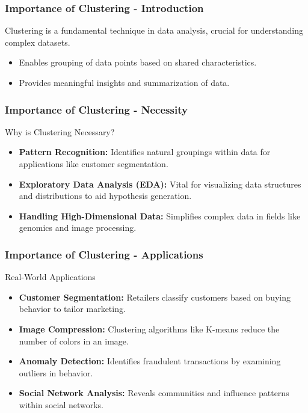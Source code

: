 \documentclass[aspectratio=169]{beamer}
\begin{document}
\begin{frame}[fragile]
    \frametitle{Importance of Clustering - Introduction}
    Clustering is a fundamental technique in data analysis, crucial for understanding complex datasets. 
    \begin{itemize}
        \item Enables grouping of data points based on shared characteristics.
        \item Provides meaningful insights and summarization of data.
    \end{itemize}
\end{frame}

\begin{frame}[fragile]
    \frametitle{Importance of Clustering - Necessity}
    \begin{block}{Why is Clustering Necessary?}
        \begin{itemize}
            \item \textbf{Pattern Recognition:} Identifies natural groupings within data for applications like customer segmentation.
            \item \textbf{Exploratory Data Analysis (EDA):} Vital for visualizing data structures and distributions to aid hypothesis generation.
            \item \textbf{Handling High-Dimensional Data:} Simplifies complex data in fields like genomics and image processing.
        \end{itemize}
    \end{block}
\end{frame}

\begin{frame}[fragile]
    \frametitle{Importance of Clustering - Applications}
    \begin{block}{Real-World Applications}
        \begin{itemize}
            \item \textbf{Customer Segmentation:} Retailers classify customers based on buying behavior to tailor marketing.
            \item \textbf{Image Compression:} Clustering algorithms like K-means reduce the number of colors in an image.
            \item \textbf{Anomaly Detection:} Identifies fraudulent transactions by examining outliers in behavior.
            \item \textbf{Social Network Analysis:} Reveals communities and influence patterns within social networks.
        \end{itemize}
    \end{block}
\end{frame}
\end{document}
